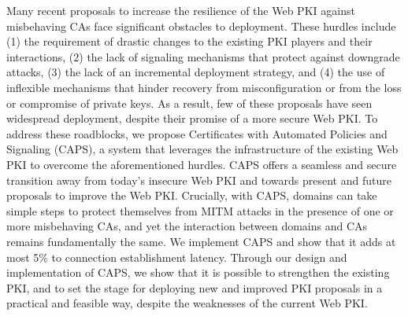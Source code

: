 Many recent proposals to increase the resilience of the Web PKI against
misbehaving CAs face significant obstacles to deployment. These hurdles include
(1) the requirement of drastic changes to the existing PKI players and their
interactions, (2) the lack of signaling mechanisms that protect against
downgrade attacks, (3) the lack of an incremental deployment strategy, and (4)
the use of inflexible mechanisms that hinder recovery from misconfiguration or
from the loss or compromise of private keys.  As a result, few of these
proposals have seen widespread deployment, despite their promise of a more
secure Web PKI.  To address these roadblocks, we propose Certificates with
Automated Policies and Signaling (CAPS), a system that leverages the
infrastructure of the existing Web PKI to overcome the aforementioned hurdles.
CAPS offers a seamless and secure transition away from today's insecure Web PKI
and towards present and future proposals to improve the Web PKI.  Crucially,
with CAPS, domains can take simple steps to protect themselves from MITM
attacks in the presence of one or more misbehaving CAs, and yet the interaction
between domains and CAs remains fundamentally the same.  We implement CAPS and
show that it adds at most 5\% to connection establishment latency.  Through our
design and implementation of CAPS, we show that it is possible to strengthen
the existing PKI, and to set the stage for deploying new and improved PKI
proposals in a practical and feasible way, despite the weaknesses of the
current Web PKI.
